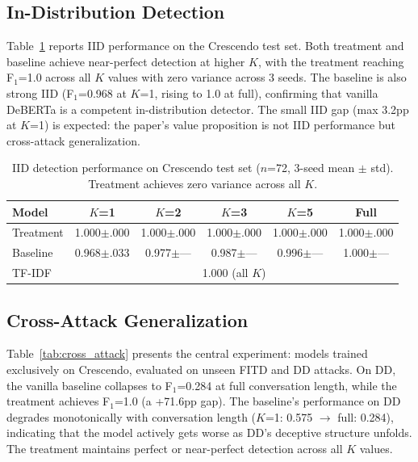 \documentclass[11pt,a4paper]{article}
\newcommand{\fone}{F$_1$}
\begin{document}
\subsection{In-Distribution Detection}
\label{sec:iid}

Table~\ref{tab:iid} reports IID performance on the Crescendo test set.
Both treatment and baseline achieve near-perfect detection at higher $K$, with the treatment reaching \fone{}=1.0 across all $K$ values with zero variance across 3 seeds.
The baseline is also strong IID (\fone{}=0.968 at $K$=1, rising to 1.0 at full), confirming that vanilla DeBERTa is a competent in-distribution detector.
The small IID gap (max 3.2pp at $K$=1) is expected: the paper's value proposition is not IID performance but cross-attack generalization.

\begin{table}[t]
\centering
\caption{IID detection performance on Crescendo test set ($n$=72, 3-seed mean $\pm$ std). Treatment achieves zero variance across all $K$.}
\label{tab:iid}
\begin{tabular}{lccccc}
\toprule
Model & $K$=1 & $K$=2 & $K$=3 & $K$=5 & Full \\
\midrule
Treatment & 1.000\tiny{$\pm$.000} & 1.000\tiny{$\pm$.000} & 1.000\tiny{$\pm$.000} & 1.000\tiny{$\pm$.000} & 1.000\tiny{$\pm$.000} \\
Baseline  & 0.968\tiny{$\pm$.033} & 0.977\tiny{$\pm$---} & 0.987\tiny{$\pm$---} & 0.996\tiny{$\pm$---} & 1.000\tiny{$\pm$---} \\
TF-IDF    & \multicolumn{5}{c}{1.000 (all $K$)} \\
\bottomrule
\end{tabular}
\end{table}

\subsection{Cross-Attack Generalization}
\label{sec:cross_attack}

Table~\ref{tab:cross_attack} presents the central experiment: models trained exclusively on Crescendo, evaluated on unseen FITD and DD attacks.
On DD, the vanilla baseline collapses to \fone{}=0.284 at full conversation length, while the treatment achieves \fone{}=1.0 (a +71.6pp gap).
The baseline's performance on DD degrades monotonically with conversation length ($K$=1: 0.575 $\to$ full: 0.284), indicating that the model actively gets worse as DD's deceptive structure unfolds.
The treatment maintains perfect or near-perfect detection across all $K$ values.
\end{document}
